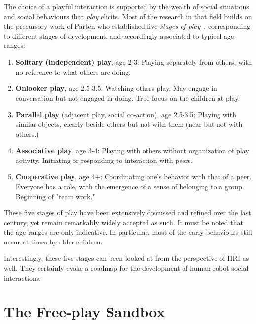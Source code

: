 \documentclass[sigconf]{acmart}
\begin{document}
The choice of a playful interaction is supported by the wealth of social
situations and social behaviours that \emph{play} elicits. Most of the research
in that field builds on the precursory work of Parten who established five
\emph{stages of play}~\cite{parten1932social}, corresponding to different stages
of development, and accordingly associated to typical age ranges:

\begin{enumerate}
    \item {\bf Solitary (independent) play}, age 2-3: Playing separately from
        others, with no reference to what others are doing.
    \item {\bf Onlooker play}, age 2.5-3.5: Watching others play. May engage in
        conversation but not engaged in doing. True focus on the children at
        play.
    \item {\bf Parallel play} (adjacent play, social co-action), age 2.5-3.5: Playing
        with similar objects, clearly beside others but not with them (near
        but not with others.)
    \item {\bf Associative play}, age 3-4:  Playing with others without
        organization of play activity. Initiating or responding to
        interaction with peers. 
    \item {\bf Cooperative play}, age 4+: Coordinating one's behavior with that
        of a peer. Everyone has a role, with the emergence of a sense of
        belonging to a group. Beginning of "team work."
\end{enumerate}

These five stages of play have been extensively discussed and refined over the
last century, yet remain remarkably widely accepted as such. It must be noted
that the age ranges are only indicative. In particular, most of the early
behaviours still occur at times by older children.

Interestingly, these five stages can been looked at from the perspective of HRI
as well. They certainly evoke a roadmap for the development of human-robot
social interactions.




\section{The Free-play Sandbox}
\label{sec:freeplay}
\end{document}
